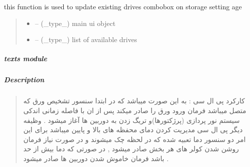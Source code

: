 \documentclass[letterpaper,10pt,english]{sphinxmanual}
\begin{document}
\begin{savenotes}\begin{fulllineitems}
\label{\detokenize{setting/backend/storage_funcs:oxin.backend.storage_funcs.update_camera_live_drive_combo}}
\pysigstartsignatures
{}
\pysigstopsignatures
\sphinxAtStartPar
this function is used to update existing drives combobox on storage setting age
\begin{quote}\begin{description}
\begin{itemize}
\item {} 
\sphinxAtStartPar
{} – (\_type\_) main ui object

\item {} 
\sphinxAtStartPar
{} – (\_type\_) list of available drives

\end{itemize}

\end{description}\end{quote}

\end{fulllineitems}\end{savenotes}


\sphinxstepscope


\subparagraph{texts module}
\label{\detokenize{setting/backend/texts:texts-module}}\label{\detokenize{setting/backend/texts::doc}}

\subparagraph{Description}
\label{\detokenize{setting/backend/texts:description}}\begin{quote}

\sphinxAtStartPar
کارکرد پی ال سی : به این صورت میباشد که در ابتدا سنسور تشخیص ورق که متصل میباشد فرمان ورود ورق را صادر میکند پس از ان با فاصله زمانی اندکی سیستم نور پردازی (پرژکتورها)و تریگ زدن به دوربین ها آغاز میشود . وظیفه دیگر پی ال سی مدیریت کردن دمای محفظه های بالا و پایین میباشد برای این امر دو سنسور دما تعبیه شده که در لحظه چک میشوند و در صورت نیاز فرمان روشن شدن کولر های هر بخش صادر میشود , در صورتی که دما بیش از حد باشد فرمان خاموش شدن دوربین ها صادر میشود .
\end{quote}

\sphinxstepscope
\end{document}
